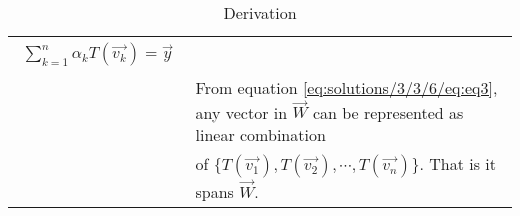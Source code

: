 \begin{table*}[ht!]
\begin{center}
{\begin{tabular}{|l|l|}
{\begin{align}
    \sum_{k=1}^{n} \alpha_kT(\vec{v_k}) = \vec{y} \label{eq:solutions/3/3/6/eq:eq3}
\end{align}} \\
& From equation \eqref{eq:solutions/3/3/6/eq:eq3}, any vector in $\vec{W}$ can be represented as linear combination\\ & of $\{T(\vec{v_1}), T(\vec{v_2}),\cdots,T(\vec{v_n})\}$. That is it spans $\vec{W}$.
\\ [0.5ex] 
\hline
\end{tabular}
}
\caption{Derivation}
\label{eq:solutions/3/3/6/table:1}
\end{center}
\end{table*}






















